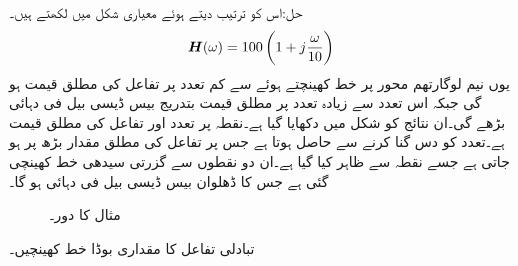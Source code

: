 حل:اس کو ترتیب دیتے ہوئے معیاری شکل میں لکھتے ہیں۔
\begin{align*}
{\ensuremath{{\boldsymbol{H}}}}(\omega)=100\left(1+j\frac{\omega}{10}\right)
\end{align*}
یوں نیم لوگارتھم محور پر خط کھینچتے ہوئے  سے کم تعدد  پر تفاعل کی مطلق قیمت  ہو گی جبکہ اس تعدد سے زیادہ تعدد پر مطلق قیمت بتدریج بیس ڈیسی بیل فی دہائی بڑھے گی۔ان نتائج کو شکل  میں دکھایا گیا ہے۔نقطہ  پر تعدد  اور تفاعل کی مطلق قیمت  ہے۔تعدد کو دس گنا کرنے سے  حاصل ہوتا ہے جس پر تفاعل کی مطلق مقدار بڑھ پر  ہو جاتی ہے جسے نقطہ  سے ظاہر کیا گیا ہے۔ان دو نقطوں سے گزرتی سیدھی خط کھینچی گئی ہے جس کا ڈھلوان بیس ڈیسی بیل فی دہائی ہو گا۔
\begin{figure}
\centering
{}
\caption{مثال  کا دور۔}
\label{شکل_تعددی_ایک_قطب_دس_تعدد}
\end{figure}
تبادلی تفاعل  کا مقداری بوڈا خط کھینچیں۔


